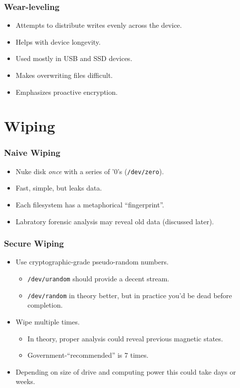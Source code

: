 \documentclass[xcolor={dvipsnames,svgnames},hyperref=dvips]{beamer}
\begin{document}
	\begin{frame}
		\frametitle{Wear-leveling}
		\begin{itemize}
		\item Attempts to distribute writes evenly across the device.
		\item Helps with device longevity.
		\item Used mostly in USB and SSD devices.
		\item Makes overwriting files difficult.
		\item Emphasizes proactive encryption.
		\end{itemize}
	\end{frame}

\section{Wiping}\label{wiping}
	\begin{frame}
		\frametitle{Naive Wiping}
		\begin{itemize}
		\item Nuke disk \textit{once} with a series of '0's (\texttt{/dev/zero}).
		\item Fast, simple, but leaks data.
		\item Each filesystem has a metaphorical ``fingerprint''.
		\item Labratory forensic analysis may reveal old data (discussed later).
		\end{itemize}
	\end{frame}

	\begin{frame}
		\frametitle{Secure Wiping}
		\begin{itemize}
		\item Use cryptographic-grade pseudo-random numbers.
			\begin{itemize}
			\item \texttt{/dev/urandom} should provide a decent stream.
			\item \texttt{/dev/random} in theory better, but in practice you'd be dead before completion.
			\end{itemize}
		\item Wipe multiple times.
			\begin{itemize}
			\item In theory, proper analysis could reveal previous magnetic states.
			\item Government-``recommended'' is 7 times.
			\end{itemize}
		\item Depending on size of drive and computing power this could take days or weeks.
		\end{itemize}
	\end{frame}
\end{document}
